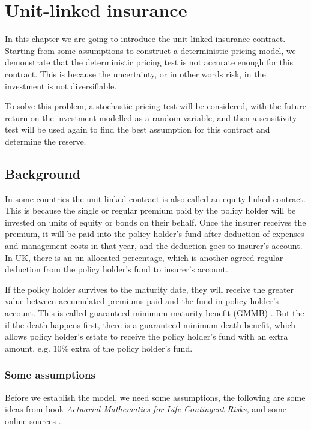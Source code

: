 \documentclass{report}
\begin{document}
\chapter{Unit-linked insurance}     \label{unit-linked}



In this chapter we are going to introduce the unit-linked insurance contract. Starting from some assumptions to construct a deterministic pricing model, we demonstrate that the deterministic pricing test is not accurate enough for this contract.
This is because the uncertainty, or in other words risk, in the investment is not diversifiable.  

To solve this problem, a stochastic pricing test will be considered, with the future return on the investment modelled as a random variable, and then a sensitivity test will be used again to find the best assumption for this contract and determine the reserve. 


\section{Background}

In some countries the unit-linked contract is also called an equity-linked contract. This is because the single or regular premium paid by the policy holder will be invested on units of equity or bonds on their behalf. Once the insurer receives the premium, it will be paid into the policy holder's fund after deduction of expenses and management costs in that year, and the deduction goes to insurer's account. In UK, there is an un-allocated percentage, which is another agreed regular deduction from the policy holder's fund to insurer's account.

If the policy holder survives to the maturity date, they will receive the greater value between accumulated premiums paid and the fund in policy holder's account. This is called guaranteed minimum maturity benefit (GMMB) \cite{bib:GMMB}. But the if the death happens first, there is a guaranteed minimum death benefit, which allows policy holder's estate to receive the policy holder's fund with an extra amount, e.g. 10\% extra of the policy holder's fund. 


\subsection{Some assumptions}  \label{unit-link-basic-assumptions}

Before we establish the model, we need some assumptions, the following are some ideas from  \cite{bib:unitlinkeg} book {\em Actuarial Mathematics for Life Contingent Risks,} and some online sources \cite{bib:unitlinkedonline}. 
\end{document}
